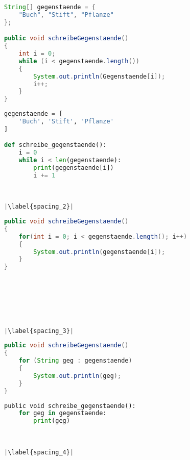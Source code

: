 \begin{minipage}{.5\linewidth}
\begin{lstlisting}[language=java,caption={while-Schleife Java},captionpos=b,label={lst:java:while},frame=none]
String[] gegenstaende = {
    "Buch", "Stift", "Pflanze"
};

public void schreibeGegenstaende()
{
    int i = 0;
    while (i < gegenstaende.length())
    {
        System.out.println(Gegenstaende[i]);
        i++;
    }
}
\end{lstlisting}
\end{minipage}
\begin{minipage}{.5\linewidth}
\begin{lstlisting}[language=python,caption={while-Schleife Python},captionpos=b,label={lst:python:while},frame=l,escapechar=|]
gegenstaende = [
    'Buch', 'Stift', 'Pflanze'
]

def schreibe_gegenstaende():
    i = 0
    while i < len(gegenstaende):
        print(gegenstaende[i])
        i += 1
        
        

|\label{spacing_2}|
\end{lstlisting}
\end{minipage}

\begin{minipage}{.5\linewidth}
\begin{lstlisting}[language=java,caption={for-Schleife Java},captionpos=b,label={lst:java:for},frame=none]
public void schreibeGegenstaende()
{
    for(int i = 0; i < gegenstaende.length(); i++)
    {
        System.out.println(gegenstaende[i]);
    }
}
\end{lstlisting}
\end{minipage}
\begin{minipage}{.5\linewidth}
\begin{lstlisting}[language=python,caption={for-Schleife Python},captionpos=b,label={lst:python:for},frame=l,escapechar=|]



        
        

|\label{spacing_3}|
\end{lstlisting}
\end{minipage}

\begin{minipage}{.5\linewidth}
\begin{lstlisting}[language=java,caption={foreach-Schleife Java},captionpos=b,label={lst:java:foreach},frame=none]
public void schreibeGegenstaende()
{
    for (String geg : gegenstaende)
    {
        System.out.println(geg);
    }
}
\end{lstlisting}
\end{minipage}
\begin{minipage}{.5\linewidth}
\begin{lstlisting}[language=python,caption={foreach-Schleife Python},captionpos=b,label={lst:python:foreach},frame=l,escapechar=|]
public void schreibe_gegenstaende():
    for geg in gegenstaende:
        print(geg)
        
        

|\label{spacing_4}|
\end{lstlisting}
\end{minipage}

